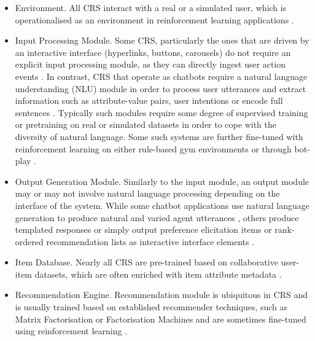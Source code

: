 \begin{itemize}
    \item Environment. All CRS interact with a real or a simulated user, which is operationalised as an environment in reinforcement learning applications \citep{mahmood2009learning, tsumita2019dialogue}.

    \item Input Processing Module. Some CRS, particularly the ones that are driven by an interactive interface (hyperlinks, buttons, carousels) do not require an explicit input processing module, as they can directly ingest user action events \citep{mahmood2009learning, mangili2020bayesian}. In contrast, CRS that operate as chatbots require a natural language understanding (NLU) module in order to process user utterances and extract information such as attribute-value pairs, user intentions or encode full sentences \citep{sun2018conversational, kang2019recommendation, tsumita2019dialogue, wang2022improving, zhou2022c2}. Typically such modules require some degree of supervised training or pretraining on real or simulated datasets in order to cope with the diversity of natural language. Some such systems are further fine-tuned with reinforcement learning on either rule-based gym environments \citep{sun2018conversational} or through bot-play \citep{kang2019recommendation}.

    \item Output Generation Module. Similarly to the input module, an output module may or may not involve natural language processing depending on the interface of the system. While some chatbot applications use natural language generation to produce natural and varied agent utterances \citep{kang2019recommendation, sun2018conversational, wang2022improving, zhou2022c2}, others produce templated responses or simply output preference elicitation items or rank-ordered recommendation lists as interactive interface elements \citep{sun2018conversational, lei2020estimation}.

    \item Item Database. Nearly all CRS are pre-trained based on collaborative user-item datasets, which are often enriched with item attribute metadata \citep{mahmood2008adaptive}.

    \item Recommendation Engine. Recommendation module is ubiquitous in CRS and is usually trained based on established recommender techniques, such as Matrix Factorisation \citep{zhao2013interactive, christakopoulou2016towards} or Factorisation Machines \citep{sun2018conversational, lei2020estimation, li2021seamlessly} and are sometimes fine-tuned using reinforcement learning \citep{tsumita2019dialogue}.


\end{itemize}
